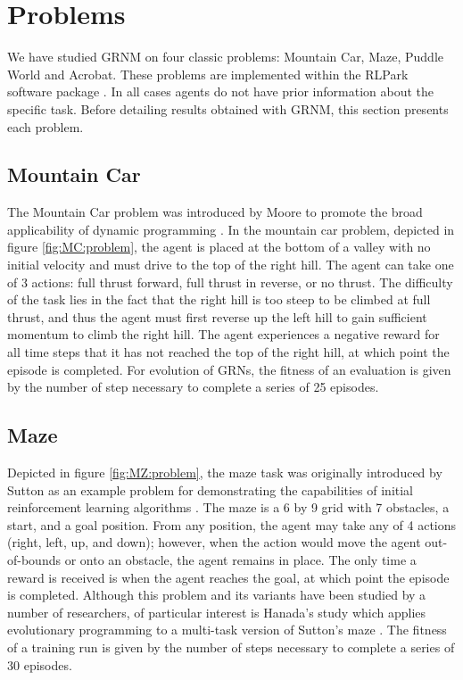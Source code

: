 

\section{Problems}

We have studied GRNM on four classic problems: Mountain Car, Maze, Puddle World and Acrobat. These problems are implemented within the RLPark software package \cite{Degris2014}. In all cases agents do not have prior information about the specific task. Before detailing results obtained with GRNM, this section presents each problem.

\subsection{Mountain Car}
The Mountain Car problem was introduced by Moore to promote the broad applicability of dynamic programming \cite{Moore1991}. In the mountain car problem, depicted in figure \ref{fig:MC:problem}, the agent is placed at the bottom of a valley with no initial velocity and must drive to the top of the right hill. The agent can take one of 3 actions: full thrust forward, full thrust in reverse, or no thrust. The difficulty of the task lies in the fact that the right hill is too steep to be climbed at full thrust, and thus the agent must first reverse up the left hill to gain sufficient momentum to climb the right hill. The agent experiences a negative reward for all time steps that it has not reached the top of the right hill, at which point the episode is completed. For evolution of GRNs, the fitness of an evaluation is given by the number of step necessary to complete a series of 25 episodes.

\subsection{Maze}

Depicted in figure \ref{fig:MZ:problem}, the maze task was originally introduced by Sutton as an example problem for demonstrating the capabilities of initial reinforcement learning algorithms \cite{Sutton1990}. The maze is a 6 by 9 grid with 7 obstacles, a start, and a goal position. From any position, the agent may take any of 4 actions (right, left, up, and down); however, when the action would move the agent out-of-bounds or onto an obstacle, the agent remains in place. The only time a reward is received is when the agent reaches the goal, at which point the episode is completed. Although this problem and its variants have been studied by a number of researchers, of particular interest is Hanada's study which applies evolutionary programming to a multi-task version of Sutton's maze \cite{Handa2007}. The fitness of a training run is given by the number of steps necessary to complete a series of 30 episodes.

